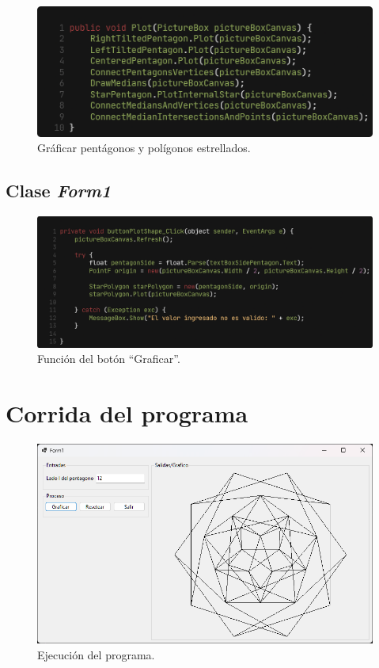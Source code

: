 \documentclass[oneside, a4paper]{article}
\begin{document}
            \begin{figure}[H]
                \centering
                \includegraphics[width=\textwidth]{plot_star_polygon.png}
                \caption{Gráficar pentágonos y polígonos estrellados.}
                \label{fig:plot_star_polygon}
            \end{figure}

        \subsection{Clase \textit{Form1}}

            \begin{figure}[H]
                \centering
                \includegraphics[width=\textwidth]{button_plot_shape.png}
                \caption{Función del botón ``Graficar''.}
                \label{fig:button_plot_shape}
            \end{figure}

    \section{Corrida del programa}

        \begin{figure}[H]
            \centering
            \includegraphics*[scale=0.5]{program_execution}
            \caption{Ejecución del programa.}
            \label{fig:program_execution}
        \end{figure}
\end{document}
